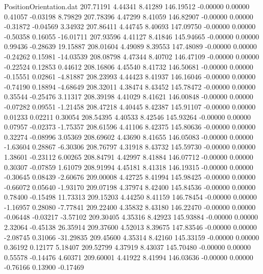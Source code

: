 \begin{filecontents}{PositionOrientation.dat}
 207.71191    4.44341    8.41289   146.19512   -0.00000    0.00000    0.41057   -0.03198    8.79829
 207.78396    4.47299    8.41059   146.82907   -0.00000    0.00000   -0.31872   -0.04569    3.34932
 207.86411    4.44745    8.40693   147.09750   -0.00000    0.00000   -0.50358    0.16055  -16.01711
 207.93596    4.41127    8.41846   145.94665   -0.00000    0.00000    0.99436   -0.28639   19.15887
 208.01604    4.49089    8.39553   147.48089   -0.00000    0.00000   -0.24262    0.15981  -14.03539
 208.08798    4.47344    8.40702   146.47109   -0.00000    0.00000   -0.22524    0.12853    0.44612
 208.16806    4.45540    8.41732   146.50681   -0.00000    0.00000   -0.15551    0.02861   -4.81887
 208.23993    4.44423    8.41937   146.16046   -0.00000    0.00000   -0.74190    0.18894   -4.68649
 208.32011    4.38474    8.43452   145.78472   -0.00000    0.00000    0.35544   -0.25476    3.11317
 208.39198    4.41029    8.41621   146.00848   -0.00000    0.00000   -0.07282    0.09551   -1.21458
 208.47218    4.40445    8.42387   145.91107   -0.00000    0.00000    0.01233    0.02211    0.30054
 208.54395    4.40533    8.42546   145.93264   -0.00000    0.00000    0.07957   -0.02373   -1.75357
 208.61596    4.41106    8.42375   145.80636   -0.00000    0.00000    0.32274   -0.08996    3.05369
 208.69602    4.43690    8.41655   146.05083   -0.00000    0.00000   -1.63604    0.28867   -6.30306
 208.76797    4.31918    8.43732   145.59730   -0.00000    0.00000    1.38601   -0.23112    6.00265
 208.84791    4.42997    8.41884   146.07712   -0.00000    0.00000    0.30307   -0.07859    1.61079
 208.91994    4.45181    8.41318   146.19315   -0.00000    0.00000   -0.30645    0.08439   -2.60676
 209.00008    4.42725    8.41994   145.98425   -0.00000    0.00000   -0.66072    0.05640   -1.93170
 209.07198    4.37974    8.42400   145.84536   -0.00000    0.00000    0.78400   -0.15498   11.73313
 209.15203    4.44250    8.41159   146.78454   -0.00000    0.00000   -1.16957    0.28080   -7.77841
 209.22400    4.35832    8.43180   146.22470   -0.00000    0.00000   -0.06448   -0.03217   -3.57102
 209.30405    4.35316    8.42923   145.93884   -0.00000    0.00000    2.32064   -0.45138   26.35914
 209.37600    4.52013    8.39675   147.83546   -0.00000    0.00000   -2.08745    0.31066  -31.29835
 209.45600    4.35314    8.42160   145.33159   -0.00000    0.00000    0.36192    0.12177    5.18407
 209.52799    4.37919    8.43037   145.70480   -0.00000    0.00000    0.55578   -0.14476    4.60371
 209.60001    4.41922    8.41994   146.03636   -0.00000    0.00000   -0.76166    0.13900   -0.17469

\end{filecontents}
